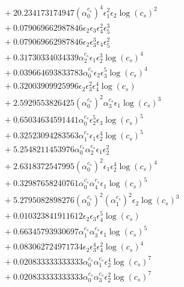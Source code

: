 \documentclass[10pt]{article}
\begin{document}
\begin{align*}
&{}  + 20.234173174947 \left(\alpha_{0}^{c_s}\right)^{4} \epsilon_{1}^{2} \epsilon_{2} \log{\left(c_{s} \right)}^{2} \\
&{}  + 0.079069662987846 \epsilon_{2} \epsilon_{3} \epsilon_{4}^{2} \epsilon_{5}^{3} \\
&{}  + 0.079069662987846 \epsilon_{2} \epsilon_{3}^{3} \epsilon_{4} \epsilon_{5}^{2} \\
&{}  + 0.31730334034339 \alpha_{2}^{c_s} \epsilon_{1} \epsilon_{2}^{3} \log{\left(c_{s} \right)}^{4} \\
&{}  + 0.039664693833783 \alpha_{0}^{c_s} \epsilon_{2} \epsilon_{3}^{5} \log{\left(c_{s} \right)}^{4} \\
&{}  + 0.32003909925996 \epsilon_{2} \epsilon_{3}^{2} \epsilon_{4}^{4} \log{\left(c_{s} \right)} \\
&{}  + 2.5929553826425 \left(\alpha_{0}^{c_s}\right)^{2} \alpha_{3}^{c_s} \epsilon_{1} \log{\left(c_{s} \right)}^{3} \\
&{}  + 0.65034634591441 \alpha_{0}^{c_s} \epsilon_{2}^{5} \epsilon_{3} \log{\left(c_{s} \right)}^{5} \\
&{}  + 0.32523094283563 \alpha_{1}^{c_s} \epsilon_{1} \epsilon_{2}^{4} \log{\left(c_{s} \right)}^{5} \\
&{}  + 5.2548211453976 \alpha_{0}^{c_s} \alpha_{2}^{c_s} \epsilon_{1} \epsilon_{2}^{2} \\
&{}  + 2.6318372547995 \left(\alpha_{0}^{c_s}\right)^{2} \epsilon_{1} \epsilon_{2}^{4} \log{\left(c_{s} \right)}^{4} \\
&{}  + 0.32987658240761 \alpha_{0}^{c_s} \alpha_{4}^{c_s} \epsilon_{1} \log{\left(c_{s} \right)}^{5} \\
&{}  + 5.2795082898276 \left(\alpha_{0}^{c_s}\right)^{2} \left(\alpha_{1}^{c_s}\right)^{2} \epsilon_{2} \log{\left(c_{s} \right)}^{3} \\
&{}  + 0.010323841911612 \epsilon_{2} \epsilon_{3} \epsilon_{4}^{5} \log{\left(c_{s} \right)} \\
&{}  + 0.66345793930697 \alpha_{1}^{c_s} \alpha_{3}^{c_s} \epsilon_{1} \log{\left(c_{s} \right)}^{5} \\
&{}  + 0.083062724971734 \epsilon_{2} \epsilon_{3}^{4} \epsilon_{4}^{2} \log{\left(c_{s} \right)}^{4} \\
&{}  + 0.020833333333333 \alpha_{0}^{c_s} \alpha_{1}^{c_s} \epsilon_{2}^{4} \log{\left(c_{s} \right)}^{7} \\
&{}  + 0.020833333333333 \alpha_{0}^{c_s} \alpha_{3}^{c_s} \epsilon_{2}^{2} \log{\left(c_{s} \right)}^{7} \\

\end{align*}
\end{document}
